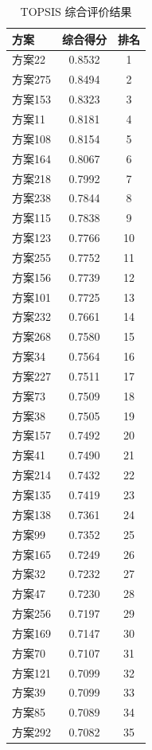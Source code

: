 \documentclass[12pt,a4paper]{article}
\begin{document}
\begin{table}[H]
  \centering
  \caption{TOPSIS 综合评价结果}
  \begin{tabular}{lcc}
    \toprule
    方案 & 综合得分 & 排名 \\
    \midrule
    方案22 & 0.8532 & 1 \\
    方案275 & 0.8494 & 2 \\
    方案153 & 0.8323 & 3 \\
    方案11 & 0.8181 & 4 \\
    方案108 & 0.8154 & 5 \\
    方案164 & 0.8067 & 6 \\
    方案218 & 0.7992 & 7 \\
    方案238 & 0.7844 & 8 \\
    方案115 & 0.7838 & 9 \\
    方案123 & 0.7766 & 10 \\
    方案255 & 0.7752 & 11 \\
    方案156 & 0.7739 & 12 \\
    方案101 & 0.7725 & 13 \\
    方案232 & 0.7661 & 14 \\
    方案268 & 0.7580 & 15 \\
    方案34 & 0.7564 & 16 \\
    方案227 & 0.7511 & 17 \\
    方案73 & 0.7509 & 18 \\
    方案38 & 0.7505 & 19 \\
    方案157 & 0.7492 & 20 \\
    方案41 & 0.7490 & 21 \\
    方案214 & 0.7432 & 22 \\
    方案135 & 0.7419 & 23 \\
    方案138 & 0.7361 & 24 \\
    方案99 & 0.7352 & 25 \\
    方案165 & 0.7249 & 26 \\
    方案32 & 0.7232 & 27 \\
    方案47 & 0.7230 & 28 \\
    方案256 & 0.7197 & 29 \\
    方案169 & 0.7147 & 30 \\
    方案70 & 0.7107 & 31 \\
    方案121 & 0.7099 & 32 \\
    方案39 & 0.7099 & 33 \\
    方案85 & 0.7089 & 34 \\
    方案292 & 0.7082 & 35 \\

\end{tabular}
\end{table}
\end{document}
